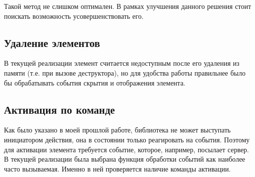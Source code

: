 Такой метод не слишком оптимален. В рамках улучшения данного решения стоит
поискать возможность усовершенствовать его.

\subsection{Удаление элементов}

В текущей реализации элемент считается недоступным после его удаления из памяти
(т.е. при вызове деструктора), но для удобства работы правильнее было бы
обрабатывать события скрытия и отображения элемента.

\subsection{Активация по команде}

Как было указано в моей прошлой работе\cite{polshakovinject}, библиотека не
может выступать инициатором действия, она в состоянии только реагировать на
события. Поэтому для активации элемента требуется событие, которое, например,
посылает сервер. В текущей реализации была выбрана функция обработки событий как
наиболее часто вызываемая. Именно в ней проверяется наличие команды активации.
